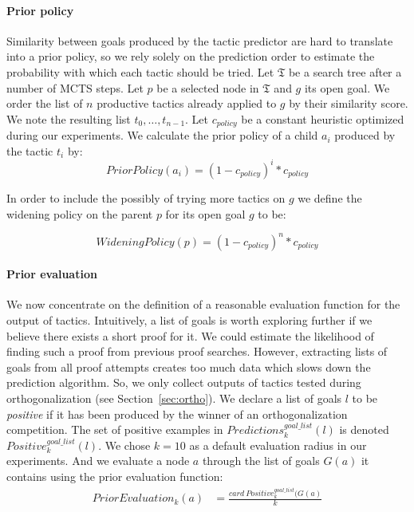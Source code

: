 \documentclass[runningheads,a4paper,draft]{svjour3}
\begin{document}
\paragraph{Prior policy}\label{sec:policy}
Similarity between goals produced by the tactic predictor are hard
to translate into a prior policy, so we rely solely on the prediction order
to estimate the probability with which each tactic should be tried.
Let $\mathfrak{T}$ be a search tree after a number of MCTS steps.
Let $p$ be a selected node in $\mathfrak{T}$ and $g$ its open goal. We order
the list of $n$ productive tactics already
applied to $g$ by their similarity score. We note the resulting list 
$t_0,\ldots,t_{n-1}$.
Let $c_{policy}$ be a constant heuristic optimized during our experiments.
We calculate the prior policy of a child $a_i$ produced by the tactic
$t_i$ by:
\[PriorPolicy(a_i) = (1 - c_{policy})^{i} * c_{policy}\]

In order to include the possibly of trying more tactics on $g$ we define the
widening policy on the parent $p$ for its open goal $g$ to be:

\[WideningPolicy(p) = (1 - c_{policy})^{n} * c_{policy}\]


\paragraph{Prior evaluation}\label{sec:evaluation}

We now concentrate on the definition of a reasonable evaluation function for the
output of tactics. Intuitively, a list of goals is worth exploring further if 
we believe there exists a short proof for it. We could estimate the likelihood 
of finding such a proof from 
previous proof searches. However, extracting lists of goals from all proof 
attempts creates too much data which slows down the prediction algorithm. 
So, we only
collect outputs of tactics tested during orthogonalization (see 
Section~\ref{sec:ortho}). We
declare a list of goals $l$ to be \textit{positive} if it has been produced 
by the winner of an orthogonalization competition.
The set of positive examples in
$\mathit{Predictions}^{\mathit{goal\_list}}_k(l)$ is denoted
$\mathit{Positive}^{\mathit{goal\_list}}_k(l)$.
We chose $k=10$ as a default evaluation radius in our experiments.
And we evaluate a node $a$ through the list of goals $G(a)$ it
contains using the prior evaluation function:
\begin{align*}
\mathit{PriorEvaluation}_k (a) &=
  \frac{card\ \mathit{Positive}^{\mathit{goal\_list}}_k(G(a)}{k}\\
\end{align*}
\end{document}
